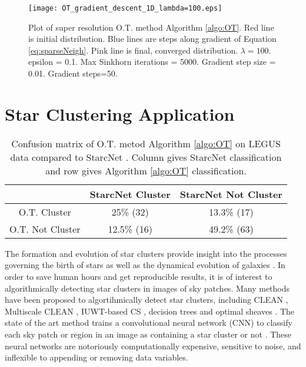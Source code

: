 \documentclass[conference]{IEEEtran}
\begin{document}
\begin{figure}[t]
\centerline{\texttt{[image: OT\_gradient\_descent\_1D\_lambda=100.eps]}}
\caption{
Plot of super resolution O.T. method Algorithm \ref{algo:OT}. Red line is initial distribution. Blue lines are steps along gradient of Equation \eqref{eq:sparseNeigh}. Pink line is final, converged distribution. $\lambda=100$.
epsilon = 0.1. Max Sinkhorn iterations = 5000. Gradient step size = 0.01. Gradient steps=50.}
\label{fig:high_sparse}
\end{figure}

\section{Star Clustering Application}\label{sec:Star}

\begin{table}[h]
\caption{Confusion matrix of O.T. metod Algorithm \ref{algo:OT} on LEGUS data compared to StarcNet \cite{perez}. Column gives StarcNet classification and row gives Algorithm \ref{algo:OT} classification.}
\begin{center}
\begin{tabular}{c|c|c|}
 & StarcNet Cluster & StarcNet Not Cluster \\
\hline
O.T. Cluster     & 25\% (32) & 13.3\% (17)  \\
\hline
O.T. Not Cluster & 12.5\% (16) & 49.2\% (63)  \\
\hline
\end{tabular}
\label{table:2}
\end{center}
\end{table}

The formation and evolution of star clusters provide insight into the processes governing the birth of stars as well as the dynamical evolution of galaxies \cite{perez}. 
In order to save human hours and get reproducible results, it is of interest to algorithmically detecting star clusters in images of sky patches. Many methods have been proposed to algortihmically detect star clusters, including CLEAN \cite{hogbom}, Multiscale CLEAN \cite{cornwell2008}, IUWT-based CS \cite{li}, decision trees \cite{grasha} and optimal sheaves \cite{robinson}. The state of the art method trains a convolutional neural network (CNN) to classify each sky patch or region in an image as containing a star cluster or not \cite{perez}. These neural networks are notoriously computationally expensive, sensitive to noise, and inflexible to appending or removing data variables. 
\end{document}
